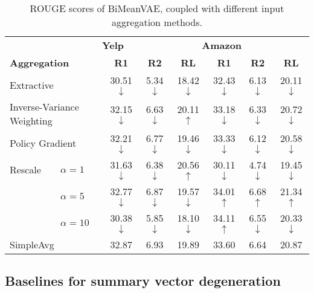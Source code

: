 \documentclass[11pt]{article}
\newcommand{\name}{\mbox{\sc BiMeanVAE}}
\newcommand{\yelp}{\mbox{\bf Yelp}}
\newcommand{\amazon}{\mbox{\bf Amazon}}
\begin{document}
\begin{table*}[ht]
\centering
\begin{tabular}{llcccccc}\toprule
& \multicolumn{3}{c}{\yelp} & \multicolumn{3}{c}{\amazon} \\
\multicolumn{2}{l}{\textbf{Aggregation}} & \multicolumn{1}{c}{\bf R1} & \multicolumn{1}{c}{\bf R2}  &\multicolumn{1}{c}{\bf RL}  & \multicolumn{1}{c}{\bf R1} & \multicolumn{1}{c}{\bf R2}  &\multicolumn{1}{c}{\bf RL}   \\\midrule
\multicolumn{2}{l}{Extractive} & {\color{red} 30.51$\downarrow$} & {\color{red}5.34$\downarrow$} & {\color{red}18.42$\downarrow$} & {\color{red}32.43$\downarrow$} & {\color{red}6.13$\downarrow$} & {\color{red}20.11$\downarrow$} \\
\multicolumn{2}{l}{Inverse-Variance Weighting} & {\color{red}32.15$\downarrow$} & {\color{red}6.63$\downarrow$} & {\color{darkgreen} 20.11$\uparrow$} & {\color{red}33.18$\downarrow$} & {\color{red}6.33$\downarrow$} & {\color{red}20.72$\downarrow$} \\
\multicolumn{2}{l}{Policy Gradient} & {\color{red}32.21$\downarrow$} & {\color{red}6.77$\downarrow$} & {\color{red}19.46$\downarrow$} & {\color{red}33.33$\downarrow$} & {\color{red}6.12$\downarrow$} & {\color{red}20.58$\downarrow$}\\
Rescale & $\alpha = 1$ &  {\color{red}31.63$\downarrow$} &  {\color{red}6.38$\downarrow$} &  {\color{darkgreen} 20.56$\uparrow$} &  {\color{red} 30.11$\downarrow$} & {\color{red} 4.74$\downarrow$} &  {\color{red} 19.45$\downarrow$} \\
& $\alpha =  5$  &  {\color{red} 32.77$\downarrow$} & {\color{red} 6.87$\downarrow$} &  {\color{red}19.57$\downarrow$} &  {\color{darkgreen} 34.01$\uparrow$} & {\color{darkgreen}  6.68$\uparrow$} &  {\color{darkgreen} 21.34$\uparrow$} \\
& $\alpha =  10$ &  {\color{red} 30.38$\downarrow$} &  {\color{red} 5.85$\downarrow$} &  {\color{red} 18.10$\downarrow$} &  {\color{darkgreen} 34.11$\uparrow$} &  {\color{red} 6.55$\downarrow$} &  {\color{red}20.33$\downarrow$} \\\midrule
\multicolumn{2}{l}{SimpleAvg} & 32.87 &  6.93 &  19.89 & 33.60 & 6.64 &  20.87 \\\bottomrule
\end{tabular}
\caption{ROUGE scores of \name{}, coupled with different input aggregation methods.
}\label{tab:other_agg}
\end{table*}

\subsection{Baselines for summary vector degeneration}
\end{document}
